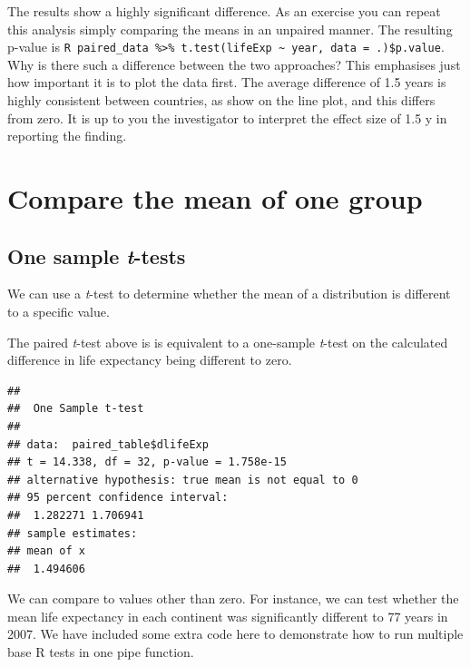 \documentclass[12pt,]{krantz}
\makeatletter
\newenvironment{Shaded}{\begin{snugshade}}{\end{snugshade}}
\newcommand{\KeywordTok}[1]{\textcolor[rgb]{0.13,0.29,0.53}{\textbf{#1}}}
\newcommand{\NormalTok}[1]{#1}
\newcommand{\OperatorTok}[1]{\textcolor[rgb]{0.81,0.36,0.00}{\textbf{#1}}}
\newenvironment{kframe}{%
\medskip{}
\setlength{\fboxsep}{.8em}
 \def\at@end@of@kframe{}%
 \ifinner\ifhmode%
  \def\at@end@of@kframe{\end{minipage}}%
  \begin{minipage}{\columnwidth}%
 \fi\fi%
 \def\FrameCommand##1{\hskip\@totalleftmargin \hskip-\fboxsep
 \colorbox{shadecolor}{##1}\hskip-\fboxsep
     \hskip-\linewidth \hskip-\@totalleftmargin \hskip\columnwidth}%
 \MakeFramed {\advance\hsize-\width
   \@totalleftmargin\z@ \linewidth\hsize
   \@setminipage}}%
 {\par\unskip\endMakeFramed%
 \at@end@of@kframe}
\renewenvironment{Shaded}{\begin{kframe}}{\end{kframe}}
\theoremstyle{definition}
\theoremstyle{definition}
\theoremstyle{definition}
\theoremstyle{remark}
\makeatother
\begin{document}

The results show a highly significant difference. As an exercise you can
repeat this analysis simply comparing the means in an unpaired manner.
The resulting p-value is
\texttt{R\ paired\_data\ \%\textgreater{}\%\ t.test(lifeExp\ \textasciitilde{}\ year,\ data\ =\ .)\$p.value}.
Why is there such a difference between the two approaches? This
emphasises just how important it is to plot the data first. The average
difference of 1.5 years is highly consistent between countries, as show
on the line plot, and this differs from zero. It is up to you the
investigator to interpret the effect size of 1.5 y in reporting the
finding.

\hypertarget{compare-the-mean-of-one-group}{%
\section{Compare the mean of one
group}\label{compare-the-mean-of-one-group}}

\hypertarget{one-sample-t-tests}{%
\subsection{\texorpdfstring{One sample
\emph{t}-tests}{One sample t-tests}}\label{one-sample-t-tests}}


We can use a \emph{t}-test to determine whether the mean of a
distribution is different to a specific value.

The paired \emph{t}-test above is is equivalent to a one-sample
\emph{t}-test on the calculated difference in life expectancy being
different to zero.

\begin{Shaded}
\end{Shaded}

\begin{verbatim}
## 
##  One Sample t-test
## 
## data:  paired_table$dlifeExp
## t = 14.338, df = 32, p-value = 1.758e-15
## alternative hypothesis: true mean is not equal to 0
## 95 percent confidence interval:
##  1.282271 1.706941
## sample estimates:
## mean of x 
##  1.494606
\end{verbatim}

We can compare to values other than zero. For instance, we can test
whether the mean life expectancy in each continent was significantly
different to 77 years in 2007. We have included some extra code here to
demonstrate how to run multiple base R tests in one pipe function.
\end{document}
